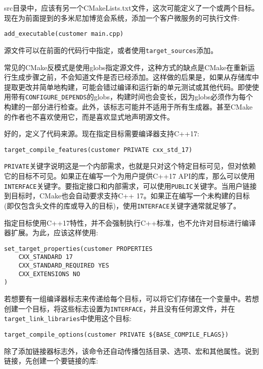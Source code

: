 src目录中，应该有另一个CMakeLists.txt文件，这次可能定义了一个或两个目标。现在为前面提到的多米尼加博览会系统，添加一个客户微服务的可执行文件:

\begin{lstlisting}[style=styleCMake]
add_executable(customer main.cpp)
\end{lstlisting}

源文件可以在前面的代码行中指定，或者使用\texttt{target\_sources}添加。

常见的CMake反模式是使用globs指定源文件，这种方式的缺点是CMake在重新运行生成步骤之前，不会知道文件是否已经添加。这样做的后果是，如果从存储库中提取更改并简单地构建，可能会错过编译和运行新的单元测试或其他代码。即使使用带有\texttt{CONFIGURE\_DEPENDS}的globs，构建时间也会变长，因为globs必须作为每个构建的一部分进行检查。此外，该标志可能并不适用于所有生成器。甚至CMake的作者也不喜欢使用它，而是喜欢显式地声明源文件。

好的，定义了代码来源。现在指定目标需要编译器支持C++17:

\begin{lstlisting}[style=styleCMake]
target_compile_features(customer PRIVATE cxx_std_17)
\end{lstlisting}

\texttt{PRIVATE}关键字说明这是一个内部需求，也就是只对这个特定目标可见，但对依赖它的目标不可见。如果正在编写一个为用户提供C++17 API的库，那么可以使用\texttt{INTERFACE}关键字。要指定接口和内部需求，可以使用\texttt{PUBLIC}关键字。当用户链接到目标时，CMake也会自动要求支持C++ 17。如果正在编写一个未构建的目标(即仅包含头文件的库或导入的目标)，使用\texttt{INTERFACE}关键字通常就足够了。

指定目标使用C++17特性，并不会强制执行C++标准，也不允许对目标进行编译器扩展。为此，应该这样使用:

\begin{lstlisting}[style=styleCMake]
set_target_properties(customer PROPERTIES
	CXX_STANDARD 17
	CXX_STANDARD_REQUIRED YES
	CXX_EXTENSIONS NO
)
\end{lstlisting}

若想要有一组编译器标志来传递给每个目标，可以将它们存储在一个变量中。若想创建一个目标，将这些标志设置为\texttt{INTERFACE}，并且没有任何源文件，并在\texttt{target\_link\_libraries}中使用这个目标:

\begin{lstlisting}[style=styleCMake]
target_compile_options(customer PRIVATE ${BASE_COMPILE_FLAGS})
\end{lstlisting}

除了添加链接器标志外，该命令还自动传播包括目录、选项、宏和其他属性。说到链接，先创建一个要链接的库:

